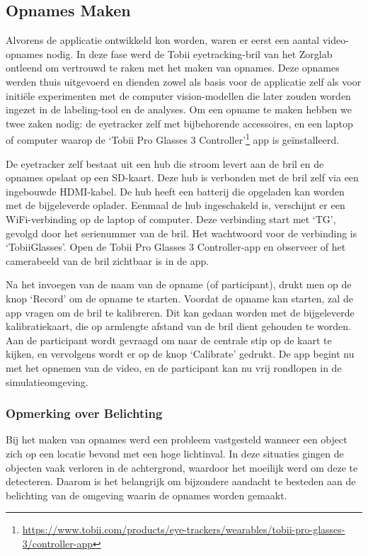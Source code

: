 \subsection{Opnames Maken}

Alvorens de applicatie ontwikkeld kon worden, waren er eerst een aantal video-opnames nodig. 
In deze fase werd de Tobii eyetracking-bril van het Zorglab ontleend om vertrouwd te raken met het maken van opnames. 
Deze opnames werden thuis uitgevoerd en dienden zowel als basis voor de applicatie zelf als voor initiële experimenten met de computer vision-modellen die later zouden worden ingezet in de labeling-tool en de analyses.
Om een opname te maken hebben we twee zaken nodig: de eyetracker zelf met bijbehorende accessoires, en een laptop of computer waarop de `Tobii Pro Glasses 3 Controller'\footnote{\url{https://www.tobii.com/products/eye-trackers/wearables/tobii-pro-glasses-3/controller-app}} app is geïnstalleerd.

De eyetracker zelf bestaat uit een hub die stroom levert aan de bril en de opnames opslaat op een SD-kaart. 
Deze hub is verbonden met de bril zelf via een ingebouwde HDMI-kabel.
De hub heeft een batterij die opgeladen kan worden met de bijgeleverde oplader. 
Eenmaal de hub ingeschakeld is, verschijnt er een WiFi-verbinding op de laptop of computer.
Deze verbinding start met `TG', gevolgd door het serienummer van de bril. Het wachtwoord voor de verbinding is `TobiiGlasses'. 
Open de Tobii Pro Glasses 3 Controller-app en observeer of het camerabeeld van de bril zichtbaar is in de app.

Na het invoegen van de naam van de opname (of participant), drukt men op de knop `Record' om de opname te starten.
Voordat de opname kan starten, zal de app vragen om de bril te kalibreren. 
Dit kan gedaan worden met de bijgeleverde kalibratiekaart, die op armlengte afstand van de bril dient gehouden te worden.
Aan de participant wordt gevraagd om naar de centrale stip op de kaart te kijken, en vervolgens wordt er op de knop `Calibrate' gedrukt.
De app begint nu met het opnemen van de video, en de participant kan nu vrij rondlopen in de simulatieomgeving.

\subsubsection{Opmerking over Belichting}

Bij het maken van opnames werd een probleem vastgesteld wanneer een object zich op een locatie bevond met een hoge lichtinval.
In deze situaties gingen de objecten vaak verloren in de achtergrond, waardoor het moeilijk werd om deze te detecteren.
Daarom is het belangrijk om bijzondere aandacht te besteden aan de belichting van de omgeving waarin de opnames worden gemaakt.

